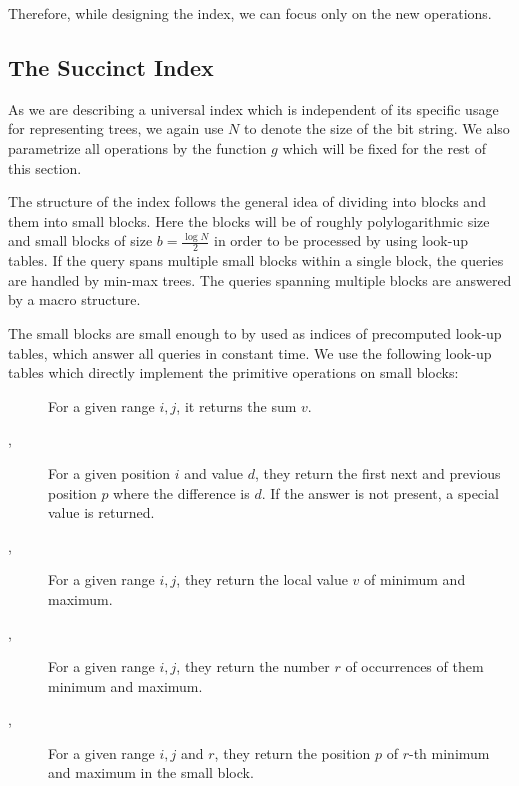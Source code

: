 Therefore, while designing the index, we can focus only on the new operations.

\subsection{The Succinct Index}

As we are describing a universal index which is independent of its specific usage for representing trees, we again use $N$ to denote the size of the bit string.
We also parametrize all operations by the function $g$ which will be fixed for the rest of this section.

The structure of the index follows the general idea of dividing into blocks and them into small blocks.
Here the blocks will be of roughly polylogarithmic size and small blocks of size $b = \frac{\log N}{2}$ in order to be processed by using look-up tables.
If the query spans multiple small blocks within a single block, the queries are handled by min-max trees.
The queries spanning multiple blocks are answered by a macro structure.

\bigbreak

The small blocks are small enough to by used as indices of precomputed look-up tables, which answer all queries in constant time.
We use the following look-up tables which directly implement the primitive operations on small blocks:
\begin{description}
	\item[\summ{}]
	For a given range $i, j$, it returns the sum $v$.
	
	\item[\fwdSearch{}, \bwdSearch{}]
	For a given position $i$ and value $d$, they return the first next and previous position $p$ where the difference is $d$.
	If the answer is not present, a special value is returned.
	
	\item[\rmq{}, \RMQ{}]
	For a given range $i, j$, they return the local value $v$ of minimum and maximum.
	
	\item[\rmqSize{}, \RMQSize{}]
	For a given range $i, j$, they return the number $r$ of occurrences of them minimum and maximum.
	
	\item[\rmqSelect{}, \RMQSelect{}]
	For a given range $i, j$ and $r$, they return the position $p$ of $r$-th minimum and maximum in the small block.	
\end{description}

